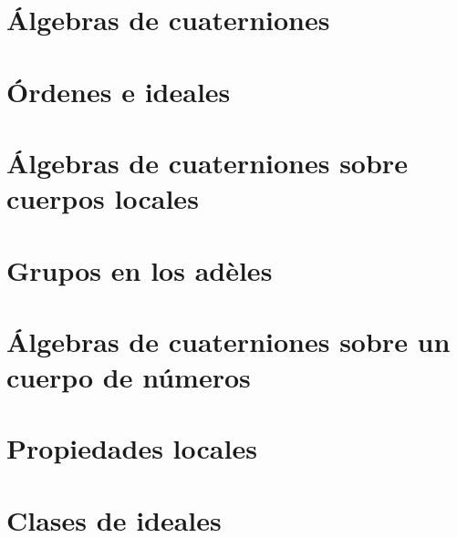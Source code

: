 

\section{\'{A}lgebras de cuaterniones}\label{sec:algebrasdecuaterniones}

\section{\'{O}rdenes e ideales}\label{sec:ordeneseideales}

\section{\'{A}lgebras de cuaterniones sobre cuerpos locales}%
	\label{sec:algebrasdecuaternioneslocal}

\section{Grupos en los ad\`{e}les}\label{sec:gruposenlosadeles}

\section{\'{A}lgebras de cuaterniones sobre un cuerpo de n\'{u}meros}%
	\label{sec:algebrasdecuaternionesglobal}

\section{Propiedades locales}\label{sec:propiedadeslocales}

\section{Clases de ideales}\label{sec:clasesdeideales}


